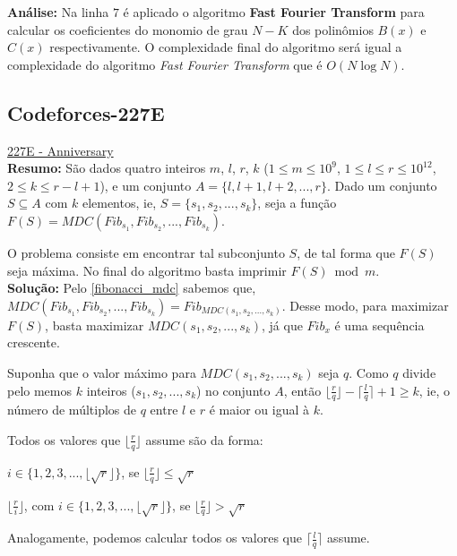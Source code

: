 \textbf{Análise:}
Na linha $7$ é aplicado o algoritmo \textbf{Fast Fourier Transform} para calcular os coeficientes do monomio de grau $N-K$ dos 
polinômios $B(x)$ e $C(x)$ respectivamente. O complexidade final do algoritmo será igual a complexidade do algoritmo \textit{Fast Fourier Transform} que é $O(N\log N)$.



\subsection{Codeforces-227E}
\href{http://codeforces.com/contest/227/problem/E}{227E - Anniversary}\\

\textbf{Resumo:}
São dados quatro inteiros $m$, $l$, $r$, $k$ ($1\leq m\leq 10^9$, $1\leq l \leq r \leq 10^{12}$, $2\leq k\leq r-l+1$), 
e um conjunto $A = \{l,l+1,l+2,...,r\}$.
Dado um conjunto $S \subseteq A$ com $k$ elementos, ie, $S = \{s_1, s_2,...,s_k\}$, seja a função 
$F(S) = MDC(Fib_{s_1}, Fib_{s_2}, ..., Fib_{s_k})$.

O problema consiste em encontrar tal subconjunto $S$, de tal forma que $F(S)$ seja máxima. No final do algoritmo basta imprimir 
$F(S) \bmod m$.
\\

\textbf{Solução:}
Pelo \autoref{fibonacci_mdc} sabemos que, $MDC(Fib_{s_1}, Fib_{s_2}, ..., Fib_{s_k}) = Fib_{MDC(s_1,s_2,...,s_k)}$.
Desse modo, para maximizar $F(S)$, basta maximizar $MDC(s_1,s_2,...,s_k)$, já que $Fib_x$ é uma sequência crescente.

Suponha que o valor máximo para $MDC(s_1,s_2,...,s_k)$ seja $q$. Como $q$ divide pelo memos $k$ inteiros ($s_1,s_2,...,s_k$)
no conjunto $A$, então $\lfloor \frac{r}{q} \rfloor -\lceil \frac{l}{q} \rceil + 1 \geq k$, ie, o número de múltiplos de $q$ entre $l$ e $r$ é maior ou igual à $k$.

Todos os valores que $\lfloor \frac{r}{q} \rfloor$ assume são da forma:
\newline

$i \in \{1,2,3,...,\lfloor\sqrt{r}\rfloor\}$, se $\lfloor \frac{r}{q} \rfloor \leq \sqrt{r}$

$\lfloor \frac{r}{i} \rfloor$, com $i \in \{1,2,3,...,\lfloor\sqrt{r}\rfloor\}$, se $\lfloor \frac{r}{q} \rfloor > \sqrt{r}$
\newline

Analogamente, podemos calcular todos os valores que $\lceil \frac{l}{q} \rceil$ assume.


